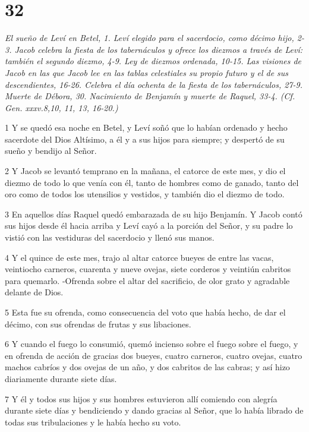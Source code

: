 \chapter{32}

\par \textit{El sueño de Leví en Betel, 1. Leví elegido para el sacerdocio, como décimo hijo, 2-3. Jacob celebra la fiesta de los tabernáculos y ofrece los diezmos a través de Leví: también el segundo diezmo, 4-9. Ley de diezmos ordenada, 10-15. Las visiones de Jacob en las que Jacob lee en las tablas celestiales su propio futuro y el de sus descendientes, 16-26. Celebra el día ochenta de la fiesta de los tabernáculos, 27-9. Muerte de Débora, 30. Nacimiento de Benjamín y muerte de Raquel, 33-4. (Cf. Gen. xxxv.8,10, 11, 13, 16-20.)}

\par 1 Y se quedó esa noche en Betel, y Leví soñó que lo habían ordenado y hecho sacerdote del Dios Altísimo, a él y a sus hijos para siempre; y despertó de su sueño y bendijo al Señor.
\par 2 Y Jacob se levantó temprano en la mañana, el catorce de este mes, y dio el diezmo de todo lo que venía con él, tanto de hombres como de ganado, tanto del oro como de todos los utensilios y vestidos, y también dio el diezmo de todo.
\par 3 En aquellos días Raquel quedó embarazada de su hijo Benjamín. Y Jacob contó sus hijos desde él hacia arriba y Leví cayó a la porción del Señor, y su padre lo vistió con las vestiduras del sacerdocio y llenó sus manos.
\par 4 Y el quince de este mes, trajo al altar catorce bueyes de entre las vacas, veintiocho carneros, cuarenta y nueve ovejas, siete corderos y veintiún cabritos para quemarlo. -Ofrenda sobre el altar del sacrificio, de olor grato y agradable delante de Dios.
\par 5 Esta fue su ofrenda, como consecuencia del voto que había hecho, de dar el décimo, con sus ofrendas de frutas y sus libaciones.
\par 6 Y cuando el fuego lo consumió, quemó incienso sobre el fuego sobre el fuego, y en ofrenda de acción de gracias dos bueyes, cuatro carneros, cuatro ovejas, cuatro machos cabríos y dos ovejas de un año, y dos cabritos de las cabras; y así hizo diariamente durante siete días.
\par 7 Y él y todos sus hijos y sus hombres estuvieron allí comiendo con alegría durante siete días y bendiciendo y dando gracias al Señor, que lo había librado de todas sus tribulaciones y le había hecho su voto.
